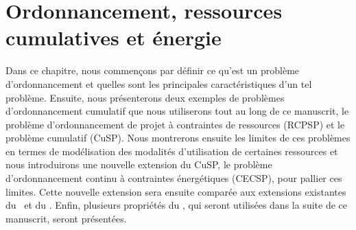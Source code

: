 

\chapter{Ordonnancement, ressources cumulatives et énergie}
\label{sec:chapter1}
Dans ce chapitre, nous commençons par définir ce qu'est un problème
d'ordonnancement et quelles sont les principales caractéristiques d'un
tel problème. Ensuite, nous présenterons deux exemples de problèmes
d'ordonnancement cumulatif que nous utiliserons tout au long de ce
manuscrit, le problème d'ordonnancement de projet à contraintes de
ressources (RCPSP) et le problème cumulatif (CuSP). Nous montrerons
ensuite les limites de ces problèmes en termes de modélisation des
modalités d'utilisation de certaines ressources et nous introduirons une nouvelle 
extension du CuSP, le problème d'ordonnancement continu à contraintes
énergétiques (CECSP), pour pallier ces limites. Cette nouvelle
extension sera ensuite comparée aux extensions existantes du \RCPSP~et
du \CUSP.  Enfin, plusieurs propriétés du \CECSP, qui seront utilisées
dans la suite de ce manuscrit, seront présentées.





